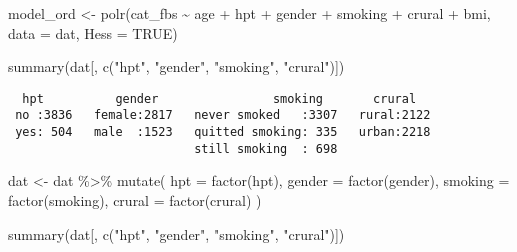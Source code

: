 \documentclass[
  letterpaper,
  DIV=11,
  numbers=noendperiod]{scrartcl}
\newenvironment{Shaded}{\begin{snugshade}}{\end{snugshade}}
\newcommand{\AttributeTok}[1]{\textcolor[rgb]{0.40,0.45,0.13}{#1}}
\newcommand{\ConstantTok}[1]{\textcolor[rgb]{0.56,0.35,0.01}{#1}}
\newcommand{\FunctionTok}[1]{\textcolor[rgb]{0.28,0.35,0.67}{#1}}
\newcommand{\NormalTok}[1]{\textcolor[rgb]{0.00,0.23,0.31}{#1}}
\newcommand{\OtherTok}[1]{\textcolor[rgb]{0.00,0.23,0.31}{#1}}
\newcommand{\SpecialCharTok}[1]{\textcolor[rgb]{0.37,0.37,0.37}{#1}}
\newcommand{\StringTok}[1]{\textcolor[rgb]{0.13,0.47,0.30}{#1}}
\begin{document}
\begin{Shaded}
\begin{Highlighting}[]
\NormalTok{model\_ord }\OtherTok{\textless{}{-}} \FunctionTok{polr}\NormalTok{(cat\_fbs }\SpecialCharTok{\textasciitilde{}}\NormalTok{ age }\SpecialCharTok{+}\NormalTok{ hpt }\SpecialCharTok{+}\NormalTok{ gender }\SpecialCharTok{+}\NormalTok{ smoking }\SpecialCharTok{+}\NormalTok{ crural }\SpecialCharTok{+}\NormalTok{ bmi, }\AttributeTok{data =}\NormalTok{ dat, }\AttributeTok{Hess =} \ConstantTok{TRUE}\NormalTok{)}
\end{Highlighting}
\end{Shaded}

\begin{Shaded}
\begin{Highlighting}[]
\FunctionTok{summary}\NormalTok{(dat[, }\FunctionTok{c}\NormalTok{(}\StringTok{"hpt"}\NormalTok{, }\StringTok{"gender"}\NormalTok{, }\StringTok{"smoking"}\NormalTok{, }\StringTok{"crural"}\NormalTok{)])}
\end{Highlighting}
\end{Shaded}

\begin{verbatim}
  hpt          gender                smoking       crural    
 no :3836   female:2817   never smoked   :3307   rural:2122  
 yes: 504   male  :1523   quitted smoking: 335   urban:2218  
                          still smoking  : 698               
\end{verbatim}

\begin{Shaded}
\begin{Highlighting}[]
\NormalTok{dat }\OtherTok{\textless{}{-}}\NormalTok{ dat }\SpecialCharTok{\%\textgreater{}\%}
  \FunctionTok{mutate}\NormalTok{(}
    \AttributeTok{hpt =} \FunctionTok{factor}\NormalTok{(hpt),}
    \AttributeTok{gender =} \FunctionTok{factor}\NormalTok{(gender),}
    \AttributeTok{smoking =} \FunctionTok{factor}\NormalTok{(smoking),}
    \AttributeTok{crural =} \FunctionTok{factor}\NormalTok{(crural)}
\NormalTok{  )}
\end{Highlighting}
\end{Shaded}

\begin{Shaded}
\begin{Highlighting}[]
\FunctionTok{summary}\NormalTok{(dat[, }\FunctionTok{c}\NormalTok{(}\StringTok{"hpt"}\NormalTok{, }\StringTok{"gender"}\NormalTok{, }\StringTok{"smoking"}\NormalTok{, }\StringTok{"crural"}\NormalTok{)])}
\end{Highlighting}
\end{Shaded}
\end{document}
